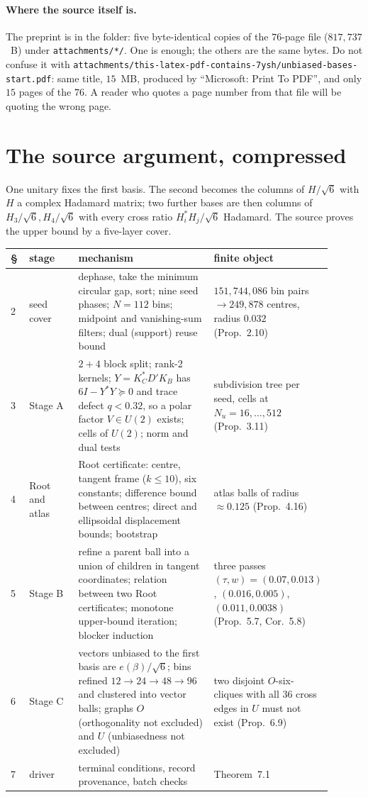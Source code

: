 \documentclass[10pt]{article}
\theoremstyle{definition}
\newcommand{\file}[1]{\texttt{\small #1}}
\begin{document}
\paragraph{Where the source itself is.} The preprint is in the folder: five byte-identical copies of the
$76$-page file ($817{,}737$~B) under \file{attachments/*/}. One is enough; the others are the same bytes.
Do not confuse it with \file{attachments/this-latex-pdf-contains-7ysh/unbiased-bases-start.pdf}: same title,
$15$~MB, produced by ``Microsoft: Print To PDF'', and only $15$ pages of the $76$. A reader who quotes a
page number from that file will be quoting the wrong page.

\section{The source argument, compressed}\label{sec:source}

One unitary fixes the first basis. The second becomes the columns of $H/\sqrt6$ with $H$ a complex
Hadamard matrix; two further bases are then columns of $H_3/\sqrt6,H_4/\sqrt6$ with every cross ratio
$H_i^*H_j/\sqrt6$ Hadamard. The source proves the upper bound by a five-layer cover.

\begin{center}
\small
\begin{tabular}{@{}p{0.06\linewidth}p{0.17\linewidth}p{0.47\linewidth}p{0.20\linewidth}@{}}
\toprule
\S & stage & mechanism & finite object \\
\midrule
2 & seed cover & dephase, take the minimum circular gap, sort; nine seed phases; $N=112$ bins;
midpoint and vanishing-sum filters; dual (support) reuse bound & $151{,}744{,}086$ bin pairs
$\to249{,}878$ centres, radius $0.032$ (Prop.~2.10) \\
3 & Stage A & $2+4$ block split; rank-2 kernels; $Y=K_C^*D'K_B$ has $6I-Y^*Y\succeq0$ and trace
defect $q<0.32$, so a polar factor $V\in U(2)$ exists; cells of $U(2)$; norm and dual tests &
subdivision tree per seed, cells at $N_u=16,\dots,512$ (Prop.~3.11) \\
4 & Root and atlas & Root certificate: centre, tangent frame ($k\le10$), six constants; difference
bound between centres; direct and ellipsoidal displacement bounds; bootstrap & atlas balls of
radius $\approx0.125$ (Prop.~4.16) \\
5 & Stage B & refine a parent ball into a union of children in tangent coordinates; relation between
two Root certificates; monotone upper-bound iteration; blocker induction & three passes
$(\tau,w)=(0.07,0.013)$, $(0.016,0.005)$, $(0.011,0.0038)$ (Prop.~5.7, Cor.~5.8) \\
6 & Stage C & vectors unbiased to the first basis are $e(\beta)/\sqrt6$; bins refined
$12\to24\to48\to96$ and clustered into vector balls; graphs $O$ (orthogonality not excluded) and $U$
(unbiasedness not excluded) & two disjoint $O$-six-cliques with all $36$ cross edges in $U$ must
not exist (Prop.~6.9) \\
7 & driver & terminal conditions, record provenance, batch checks & Theorem~7.1 \\
\bottomrule
\end{tabular}
\end{center}
\end{document}
